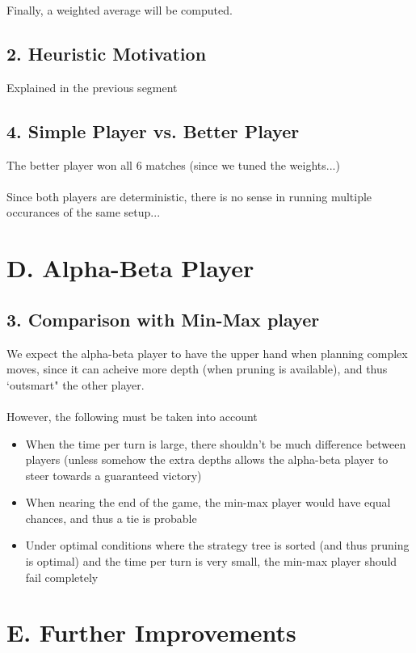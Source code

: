 \documentclass{article}
\begin{document}
Finally, a weighted average will be computed.

\subsection*{2. Heuristic Motivation}
Explained in the previous segment

\subsection*{4. Simple Player vs. Better Player}
The better player won all 6 matches (since we tuned the weights...) \\~\\
Since both players are deterministic, there is no sense in running multiple occurances of the same setup...

\section*{D. Alpha-Beta Player}
\subsection*{3. Comparison with Min-Max player}
We expect the alpha-beta player to have the upper hand when planning complex moves, since it can acheive more depth (when pruning is available), and thus `outsmart" the other player. \\~\\
However, the following must be taken into account
\begin{itemize}
\item When the time per turn is large, there shouldn't be much difference between players (unless somehow the extra depths allows the alpha-beta player to steer towards a guaranteed victory)
\item When nearing the end of the game, the min-max player would have equal chances, and thus a tie is probable
\item Under optimal conditions where the strategy tree is sorted (and thus pruning is optimal) and the time per turn is very small, the min-max player should fail completely
\end{itemize}

\section*{E. Further Improvements}
\end{document}
